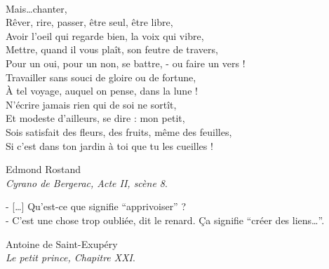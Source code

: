 
\cleardoublepage
\thispagestyle{empty}
\begin{fullwidth}
%
~\vspace{10\baselineskip}

\hfill
\begin{minipage}{10cm}
    {\nohyphenation\noindent%
        Mais\dots chanter,\\
        Rêver, rire, passer, être seul, être libre,\\
        Avoir l'oeil qui regarde bien, la voix qui vibre,\\
        Mettre, quand il vous plaît, son feutre de travers,\\
        Pour un oui, pour un non, se battre, - ou faire un vers !\\
        Travailler sans souci de gloire ou de fortune,\\
        À tel voyage, auquel on pense, dans la lune !\\
        N'écrire jamais rien qui de soi ne sortît,\\
        Et modeste d'ailleurs, se dire : mon petit,\\
        Sois satisfait des fleurs, des fruits, même des feuilles,\\
        Si c'est dans ton jardin à toi que tu les cueilles !\\[10pt]
        \begin{flushright}
        {\large\color{myblue}%
            Edmond Rostand\\
            {\itshape Cyrano de Bergerac, Acte II, scène 8}.
        }
        \end{flushright}
    
        \vspace{1.5cm}
        
        - [\ldots] Qu'est-ce que signifie ``apprivoiser'' ?\\
        - C'est une chose trop oubliée, dit le renard. \c Ca signifie ``créer des liens\dots''.\\[10pt]
        \begin{flushright}
            {\large\color{myblue}%
                Antoine de Saint-Exupéry\\
                {\itshape Le petit prince, Chapitre XXI}.
            }
        \end{flushright}
    }
\end{minipage}


\end{fullwidth}